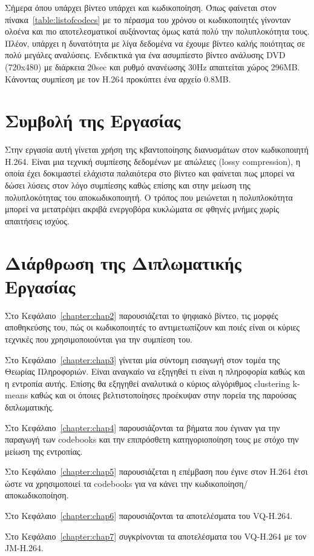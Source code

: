 \indent
Σήμερα όπου υπάρχει βίντεο υπάρχει και κωδικοποίηση. Όπως φαίνεται στον πίνακα~\ref{table:listofcodecs} με το πέρασμα του χρόνου οι κωδικοποιητές γίνονταν ολοένα και πιο αποτελεσματικοί αυξάνοντας όμως κατά πολύ την πολυπλοκότητα τους. Πλέον, υπάρχει η δυνατότητα με λίγα δεδομένα να έχουμε βίντεο καλής ποιότητας σε πολύ μεγάλες αναλύσεις. Ενδεικτικά για ένα ασυμπίεστο βίντεο ανάλυσης DVD (720x480) με διάρκεια 20sec και ρυθμό ανανέωσης \si{30}{Hz} απαιτείται χώρος 296ΜΒ. Κάνοντας συμπίεση με τον H.264 προκύπτει ένα αρχείο 0.8ΜΒ.

\section{Συμβολή της Εργασίας}
\label{section:sect12}
\indent
Στην εργασία αυτή γίνεται χρήση της κβαντοποίησης διανυσμάτων στον κωδικοποιητή H.264. Είναι μια τεχνική συμπίεσης δεδομένων με απώλειες (lossy compression), η οποία έχει δοκιμαστεί ελάχιστα παλαιότερα στο βίντεο και φαίνεται πως μπορεί να δώσει λύσεις στον λόγο συμπίεσης καθώς επίσης και στην μείωση της πολυπλοκότητας του αποκωδικοποιητή. Ο τρόπος που μειώνεται η πολυπλοκότητα μπορεί να μετατρέψει ακριβά ενεργοβόρα κυκλώματα σε φθηνές μνήμες χωρίς απαιτήσεις ισχύος.

\section{Διάρθρωση της Διπλωματικής Εργασίας}
\label{section:sect13}


\indent
Στο Κεφάλαιο~\ref{chapter:chap2} παρουσιάζεται το ψηφιακό βίντεο, τις μορφές αποθηκεύσης του, πώς οι κωδικοποιητές το αντιμετωπίζουν και ποιές είναι οι κύριες τεχνικές που χρησιμοποιούνται για την συμπίεση του.\newline

\indent
Στο Κεφάλαιο~\ref{chapter:chap3} γίνεται μία σύντομη εισαγωγή στον τομέα της Θεωρίας Πληροφοριών. Είναι αναγκαίο να εξηγηθεί τι είναι η πληροφορία καθώς και η εντροπία αυτής. Επίσης θα εξηγηθεί αναλυτικά ο κύριος αλγόριθμος clustering k-means καθώς και οι όποιες βελτιστοποίησες προέκυψαν στην πορεία της παρούσας διπλωματικής.\newline

\indent
Στο Κεφάλαιο~\ref{chapter:chap4} παρουσιάζονται τα βήματα που έγιναν για την παραγωγή των codebooks και την επιπρόσθετη κατηγοριοποίηση τους με στόχο την μείωση της εντροπίας.\newline

\indent
Στο Κεφάλαιο~\ref{chapter:chap5} παρουσιάζεται η επέμβαση που έγινε στον H.264 έτσι ώστε να χρησιμοποιεί τα codebooks για να κάνει την κωδικοποίηση/αποκωδικοποίηση.\newline 

\indent
Στο Κεφάλαιο~\ref{chapter:chap6} παρουσιάζονται τα αποτελέσματα του VQ-H.264.\newline

\indent
Στο Κεφάλαιο~\ref{chapter:chap7} συγκρίνονται τα αποτελέσματα του VQ-H.264 με τον JM-H.264.\newline